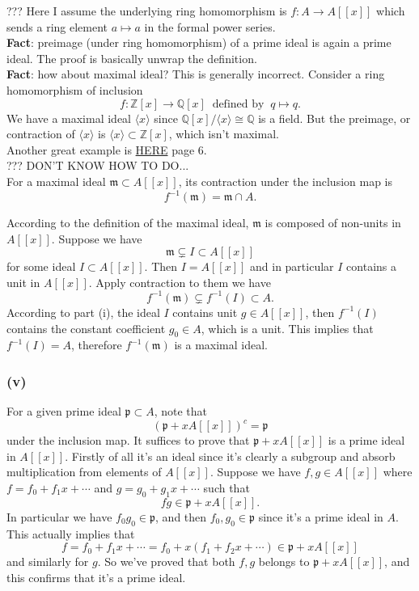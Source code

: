 ??? Here I assume the underlying ring homomorphism is $f:A\to A[[x]]$ which sends a ring element $a\mapsto a$ in the formal power series.\\

\textbf{Fact}: preimage (under ring homomorphism) of a prime ideal is again a prime ideal.
The proof is basically unwrap the definition.\\

\textbf{Fact}: how about maximal ideal? This is generally incorrect.
Consider a ring homomorphism of inclusion 
$$f:\mathbb Z[x]\to \mathbb Q[x] ~\text{  defined  by  }~ q\mapsto q.$$ 
We have a maximal ideal $\langle x\rangle$ since $\mathbb Q[x]/\langle x\rangle \cong \mathbb Q$ is a field. But the preimage, or contraction of $\langle x\rangle$ is $\langle x\rangle \subset \mathbb Z[x]$, which isn't maximal.\\
Another great example is \href{https://www.dpmms.cam.ac.uk/~sjw47/Lecture1-3.pdf}{HERE} page 6.\\

??? DON'T KNOW HOW TO DO...\\

For a maximal ideal $\mathfrak m\subset A[[x]]$, its contraction under the inclusion map is 
$$f^{-1}(\mathfrak m)=\mathfrak m\cap A.$$

According to the definition of the maximal ideal, $\mathfrak m$ is composed of non-units in $A[[x]]$. Suppose we have 
$$\mathfrak m\subsetneq I\subset  A[[x]]$$ for some ideal $I\subset A[[x]]$. Then $I=A[[x]]$ and in particular $I$ contains a unit in $A[[x]]$. Apply contraction to them we have 
$$f^{-1}(\mathfrak m)\subsetneq f^{-1}(I)\subset A.$$ According to part (i), the ideal $I$ contains unit $g\in A[[x]]$, then $f^{-1}(I)$ contains the constant coefficient $g_0\in A$, which is a unit. This implies that $f^{-1}(I)=A$, therefore $f^{-1}(\mathfrak m)$ is a maximal ideal. 



\subsubsection{(v)} 

For a given prime ideal $\mathfrak p\subset A$, note that 
$$(\mathfrak p+xA[[x]])^c=\mathfrak p$$ under the inclusion map. It suffices to prove that $\mathfrak p+xA[[x]]$ is a prime ideal in $A[[x]]$. Firstly of all it's an ideal since it's clearly a subgroup and absorb multiplication from elements of $A[[x]]$. Suppose we have $f,g\in A[[x]]$ where $f=f_0+f_1x+\cdots$ and $g=g_0+g_1x+\cdots$ such that 
$$fg\in \mathfrak p+xA[[x]].$$
In particular we have $f_0g_0\in \mathfrak p$, and then $f_0,g_0\in \mathfrak p$ since it's a prime ideal in $A$. This actually implies that 
$$f=f_0+f_1x+\cdots=f_0+x(f_1+f_2x+\cdots)\in \mathfrak p+xA[[x]]$$ and similarly for $g$. So we've proved that both $f,g$ belongs to $\mathfrak p+xA[[x]]$, and this confirms that it's a prime ideal.



